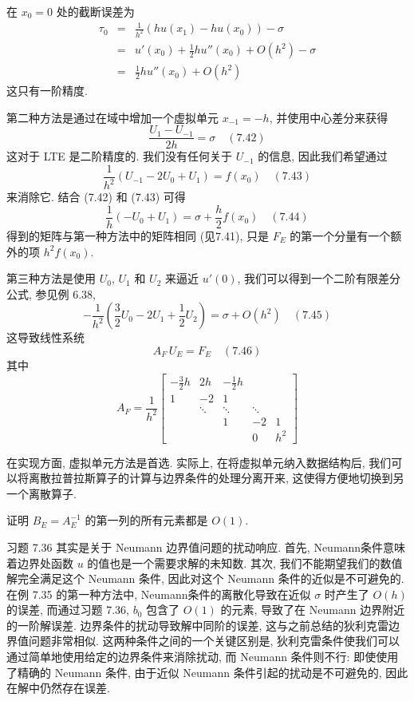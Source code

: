 \documentclass[a4paper]{ctexart}
\newcommand{\hl}[1]
{\noindent {\bf {#1}}}
\begin{document}
在 $x_0 = 0$ 处的截断误差为
\begin{eqnarray*}
\tau_0 
&=& \frac{1}{h^2} \left(hu(x_1) - hu(x_0)\right) - \sigma\\
&=& u'(x_0) + \frac{1}{2}hu''(x_0) + O(h^2) - \sigma\\
&=& \frac{1}{2}hu''(x_0) + O(h^2)
\end{eqnarray*}
这只有一阶精度.

第二种方法是通过在域中增加一个虚拟单元 $x_{-1} = -h$, 并使用中心差分来获得
$$
\frac{U_1 - U_{-1}}{2h} = \sigma \quad (7.42)
$$
这对于 LTE 是二阶精度的. 我们没有任何关于 $U_{-1}$ 的信息, 因此我们希望通过
$$
\frac{1}{h^2}(U_{-1} - 2U_0 + U_1) = f(x_0) \quad (7.43)
$$
来消除它. 结合 (7.42) 和 (7.43) 可得
$$
\frac{1}{h}(-U_0 + U_1) = \sigma + \frac{h}{2}f(x_0) \quad (7.44)
$$
得到的矩阵与第一种方法中的矩阵相同 (见7.41), 只是 $F_E$ 
的第一个分量有一个额外的项 $h^2 f(x_0)$.

第三种方法是使用 $U_0$, $U_1$ 和 $U_2$ 来逼近 $u'(0)$,
我们可以得到一个二阶有限差分公式, 参见例 6.38,
$$
-\frac{1}{h^2}\left(\frac{3}{2}U_0 - 2U_1 + \frac{1}{2}U_2\right) 
= \sigma + O(h^2) \quad (7.45)
$$
这导致线性系统
$$
A_F \, U_E = F_E \quad (7.46)
$$
其中
$$
A_F = \frac{1}{h^2}
\begin{bmatrix}
-\frac{3}{2}h & 2h & -\frac{1}{2}h &\\
1 & -2 & 1 & &\\
  & \ddots & \ddots & \ddots& \\
&&1 & -2 & 1 \\
&&&0 & h^2
\end{bmatrix}
$$

在实现方面, 虚拟单元方法是首选. 实际上, 在将虚拟单元纳入数据结构后, 
我们可以将离散拉普拉斯算子的计算与边界条件的处理分离开来, 这使得方便地切换到另一个离散算子. 

\hl{习题 7.36} 证明 $B_E = A_E^{-1}$ 的第一列的所有元素都是 $O(1)$.

习题 7.36 其实是关于 Neumann 边界值问题的扰动响应. 首先, Neumann条件意味着边界处函数 
$u$ 的值也是一个需要求解的未知数. 其次, 我们不能期望我们的数值解完全满足这个 Neumann 条件, 
因此对这个 Neumann 条件的近似是不可避免的. 在例 7.35 的第一种方法中, 
Neumann条件的离散化导致在近似 $\sigma$ 时产生了 $O(h)$ 的误差, 
而通过习题 7.36, $b_0$ 包含了 $O(1)$ 的元素, 导致了在 Neumann 边界附近的一阶解误差. 
边界条件的扰动导致解中同阶的误差, 这与之前总结的狄利克雷边界值问题非常相似. 
这两种条件之间的一个关键区别是, 狄利克雷条件使我们可以通过简单地使用给定的边界条件来消除扰动, 
而 Neumann 条件则不行: 即使使用了精确的 Neumann 条件, 
由于近似 Neumann 条件引起的扰动是不可避免的, 因此在解中仍然存在误差. 
\end{document}
